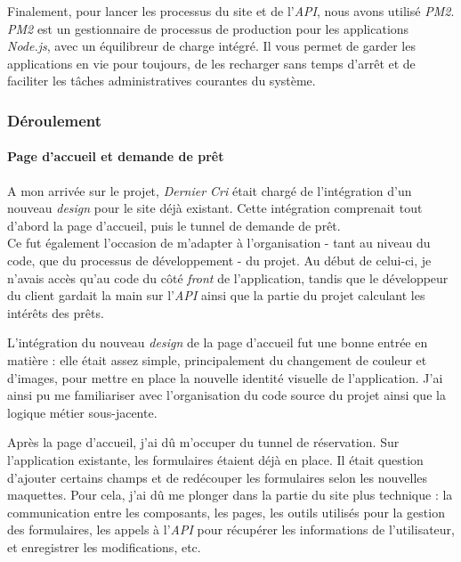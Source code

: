 \documentclass[12pt,a4paper]{article}
\begin{document}
  \bigskip

  Finalement, pour lancer les processus du site et de l'\emph{API}, nous
  avons utilisé \emph{PM2}. \emph{PM2} est un gestionnaire de processus de
  production pour les applications \emph{Node.js}, avec un équilibreur de
  charge intégré. Il vous permet de garder les applications en vie pour
  toujours, de les recharger sans temps d'arrêt et de faciliter les tâches
  administratives courantes du système.

  \bigskip

  \subsubsection{Déroulement}\label{duxe9roulement-1}

  \paragraph{Page d'accueil et demande de
  prêt}\label{page-daccueil-et-demande-de-pruxeat}

  \bigskip

  A mon arrivée sur le projet, \emph{Dernier Cri} était chargé de
  l'intégration d'un nouveau \emph{design} pour le site déjà existant.
  Cette intégration comprenait tout d'abord la page d'accueil, puis le
  tunnel de demande de prêt.\\
  Ce fut également l'occasion de m'adapter à l'organisation - tant au
  niveau du code, que du processus de développement - du projet. Au début
  de celui-ci, je n'avais accès qu'au code du côté \emph{front} de
  l'application, tandis que le développeur du client gardait la main sur
  l'\emph{API} ainsi que la partie du projet calculant les intérêts des
  prêts.

  \bigskip

  L'intégration du nouveau \emph{design} de la page d'accueil fut une
  bonne entrée en matière : elle était assez simple, principalement du
  changement de couleur et d'images, pour mettre en place la nouvelle
  identité visuelle de l'application. J'ai ainsi pu me familiariser avec
  l'organisation du code source du projet ainsi que la logique métier
  sous-jacente.

  \bigskip

  Après la page d'accueil, j'ai dû m'occuper du tunnel de réservation. Sur
  l'application existante, les formulaires étaient déjà en place. Il était
  question d'ajouter certains champs et de redécouper les formulaires
  selon les nouvelles maquettes. Pour cela, j'ai dû me plonger dans la
  partie du site plus technique : la communication entre les composants,
  les pages, les outils utilisés pour la gestion des formulaires, les
  appels à l'\emph{API} pour récupérer les informations de l'utilisateur,
  et enregistrer les modifications, etc.
\end{document}
